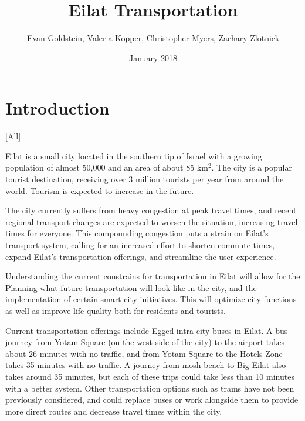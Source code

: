 \documentclass[12pt]{article}                         %
\title{Eilat Transportation}
\author{Evan Goldstein, Valeria Kopper, Christopher Myers, Zachary Zlotnick}
\date{January 2018}
\begin{document}
\maketitle
\newpage

\renewcommand\abstractname{Summary} %

\tableofcontents
\newpage
\listofauthorships
\newpage
{}
\doublespacing

\section{Introduction}[All]

Eilat is a small city located in the southern tip of Israel with a growing population of almost 50,000 and an area of about 85 km$^2$. The city is a popular tourist destination, receiving over 3 million tourists per year from around the world. Tourism is expected to increase in the future.

The city currently suffers from heavy congestion at peak travel times, and recent regional transport changes are expected to worsen the situation, increasing travel times for everyone. This compounding congestion puts a strain on Eilat's transport system, calling for an increased effort to shorten commute times, expand Eilat's transportation offerings, and streamline the user experience.

Understanding the current constrains for transportation in Eilat will allow for the Planning what future transportation will look like in the city, and the implementation of certain smart city initiatives. This will optimize city functions as well as improve life quality both for residents and tourists. 

Current transportation offerings include Egged intra-city buses in Eilat. A bus journey from Yotam Square (on the west side of the city) to the airport takes about 26 minutes with no traffic, and from Yotam Square to the Hotels Zone takes 35 minutes with no traffic. A journey from mosh beach to Big Eilat also takes around 35 minutes, but each of these trips could take less than 10 minutes with a better system. Other transportation options such as trams have not been previously considered, and could replace buses or work alongside them to provide more direct routes and decrease travel times within the city.

\end{document}

